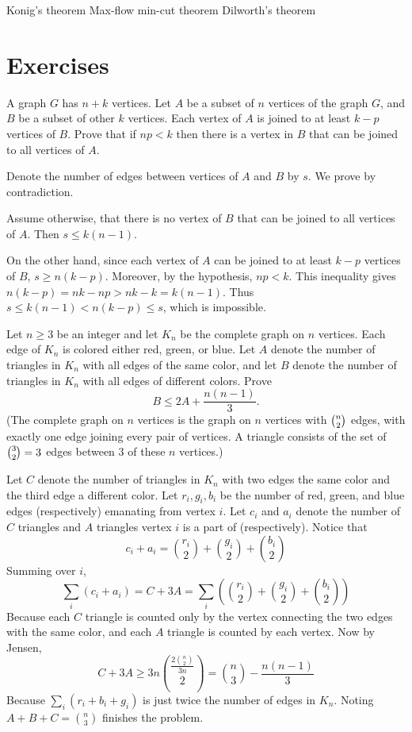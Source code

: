 Konig's theorem
Max-flow min-cut theorem
Dilworth's theorem

\pagebreak

\section*{Exercises}
\begin{prbm}
A graph $G$ has $n+k$ vertices. Let $A$ be a subset of $n$ vertices of the graph $G$, and $B$ be a subset of other $k$ vertices. Each vertex of $A$ is joined to at least $k-p$ vertices of $B$. Prove that if $np<k$ then there is a vertex in $B$ that can be joined to all vertices of $A$.
\end{prbm}

\begin{solution}
Denote the number of edges between vertices of $A$ and $B$ by $s$. We prove by contradiction.

Assume otherwise, that there is no vertex of $B$ that can be joined to all vertices of $A$. Then $s\le k(n-1)$.

On the other hand, since each vertex of $A$ can be joined to at least $k-p$ vertices of $B$, $s\ge n(k-p)$. Moreover, by the hypothesis, $np<k$. This inequality gives $n(k-p)=nk-np>nk-k=k(n-1)$. Thus $s\le k(n-1)<n(k-p)\le s$, which is impossible.
\end{solution}

\begin{prbm}
Let $n\ge 3$ be an integer and let $K_n$ be the complete graph on $n$ vertices. Each edge of $K_n$ is colored either red, green, or blue. Let $A$ denote the number of triangles in $K_n$ with all edges of the same color, and let $B$ denote the number of triangles in $K_n$ with all edges of different colors. Prove
\[ B\le 2A+\frac{n(n-1)}{3}.\](The complete graph on $n$ vertices is the graph on $n$ vertices with $\tbinom n2$ edges, with exactly one edge joining every pair of vertices. A triangle consists of the set of $\tbinom 32=3$ edges between $3$ of these $n$ vertices.)
\end{prbm}

\begin{solution}
Let $C$ denote the number of triangles in $K_n$ with two edges the same color and the third edge a different color. Let $r_i, g_i, b_i$ be the number of red, green, and blue edges (respectively) emanating from vertex $i$. Let $c_i$ and $a_i$ denote the number of $C$ triangles and $A$ triangles vertex $i$ is a part of (respectively). Notice that
$$c_i+a_i=\binom{r_i}{2}+\binom{g_i}{2}+\binom{b_i}{2}$$Summing over $i$,
$$\sum_{i}(c_i+a_i)=C+3A=\sum_{i}\left(\binom{r_i}{2}+\binom{g_i}{2}+\binom{b_i}{2}\right)$$Because each $C$ triangle is counted only by the vertex connecting the two edges with the same color, and each $A$ triangle is counted by each vertex. Now by Jensen,
$$C+3A\ge 3n\binom{\frac{2\binom{n}{2}}{3n}}{2}=\binom{n}{3}-\frac{n(n-1)}{3}$$Because $\sum_i (r_i+b_i+g_i)$ is just twice the number of edges in $K_n$. Noting $A+B+C=\binom{n}{3}$ finishes the problem.
\end{solution}
